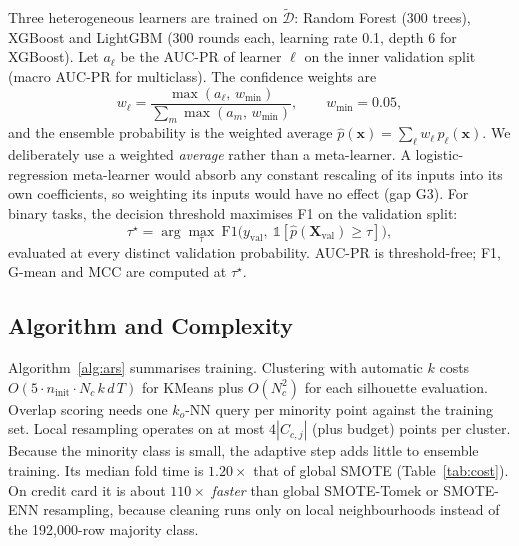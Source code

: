 \documentclass[11pt,a4paper]{article}
\begin{document}
Three heterogeneous learners are trained on $\tilde{\mathcal{D}}$: Random Forest (300 trees), XGBoost \cite{chen2016xgboost} and LightGBM \cite{ke2017lightgbm} (300 rounds each, learning rate 0.1, depth 6 for XGBoost). Let $a_\ell$ be the AUC-PR of learner $\ell$ on the inner validation split (macro AUC-PR for multiclass). The confidence weights are
\begin{equation}
w_\ell=\frac{\max(a_\ell,\,w_{\min})}{\sum_{m}\max(a_m,\,w_{\min})},\qquad w_{\min}=0.05,\label{eq:weights}
\end{equation}
and the ensemble probability is the weighted average $\hat p(\mathbf{x})=\sum_\ell w_\ell\, p_\ell(\mathbf{x})$. We deliberately use a weighted \emph{average} rather than a meta-learner. A logistic-regression meta-learner would absorb any constant rescaling of its inputs into its own coefficients, so weighting its inputs would have no effect (gap G3). For binary tasks, the decision threshold maximises F1 on the validation split:
\begin{equation}
\tau^\star=\arg\max_{\tau}\ \mathrm{F1}\big(y_{\mathrm{val}},\ \mathbb{1}[\hat p(\mathbf{X}_{\mathrm{val}})\ge\tau]\big),\label{eq:threshold}
\end{equation}
evaluated at every distinct validation probability. AUC-PR is threshold-free; F1, G-mean and MCC are computed at $\tau^\star$.

\subsection{Algorithm and Complexity}

Algorithm~\ref{alg:ars} summarises training. Clustering with automatic $k$ costs $O(5\cdot n_{\mathrm{init}}\cdot N_c\,k\,d\,T)$ for KMeans plus $O(N_c^2)$ for each silhouette evaluation. Overlap scoring needs one $k_o$-NN query per minority point against the training set. Local resampling operates on at most $4|C_{c,j}|$ (plus budget) points per cluster. Because the minority class is small, the adaptive step adds little to ensemble training. Its median fold time is $1.20\times$ that of global SMOTE (Table~\ref{tab:cost}). On credit card it is about $110\times$ \emph{faster} than global SMOTE-Tomek or SMOTE-ENN resampling, because cleaning runs only on local neighbourhoods instead of the 192{,}000-row majority class.
\end{document}
